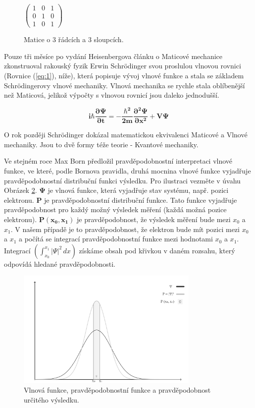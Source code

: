 \begin{figure}[ht]
    \centering
    $\begin{pmatrix}
    1 & 0 & 1 \\
    0 & 1 & 0 \\
    1 & 0 & 1
    \end{pmatrix}
    $
    \caption{\label{fig:1}Matice o 3 řádcích a 3 sloupcích.}
\end{figure}

Pouze tři měsíce po vydání Heisenbergova článku o Maticové mechanice zkonstruoval rakouský fyzik Erwin Schrödinger svou proslulou vlnovou rovnici (Rovnice (\ref{eq:1}), níže), která popisuje vývoj vlnové funkce a stala se základem Schrödingerovy vlnové mechaniky. Vlnová mechanika se rychle stala oblíbenější než Maticová, jelikož výpočty s vlnovou rovnicí jsou daleko jednodušší.

\begin{equation}
    \bm{i\hbar \frac{\partial \Psi}{\partial t} = -\frac{\hbar^2}{2m}
    \frac{\partial^2 \Psi}{\partial x^2} + V \Psi}
    \label{eq:1}
\end{equation}

O rok později Schrödinger dokázal matematickou ekvivalenci Maticové a Vlnové mechaniky. Jsou to dvě formy téže teorie - Kvantové mechaniky.

Ve stejném roce Max Born předložil pravděpodobnostní interpretaci vlnové funkce, ve které, podle Bornova pravidla, druhá mocnina vlnové funkce vyjadřuje pravděpodobnostní distribuční funkci výsledku. Pro ilustraci vezměte v úvahu Obrázek \ref{fig:2}. $\bm{\Psi}$ je vlnová funkce, která vyjadřuje stav systému, např. pozici elektronu. \textbf{P} je pravděpodobnostní distribuční funkce. Tato funkce vyjadřuje pravděpodobnost pro každý možný výsledek měření (každá možná pozice elektronu). $\bm{P(x_0,x_1)}$ je pravděpodobnost, že výsledek měření bude mezi $x_0$ a $x_1$. V našem případě je to pravděpodobnost, že elektron bude mít pozici mezi $x_0$ a $x_1$ a počítá se integrací pravděpodobnost\-ní funkce mezi hodnotami $x_0$ a $x_1$. Integrací $(\int_{x_0}^{x_1}|\Psi|^2\,dx)$ získáme obsah pod křivkou v daném rozsahu, který odpovídá hledané pravděpodobnosti. 




\begin{figure}[ht]
\centering
\includegraphics[width=250pt]{images/probability-function.png}
\caption{\label{fig:2}Vlnová funkce, pravděpodobnostní funkce a pravděpodobnost určitého výsledku.}
\end{figure}

